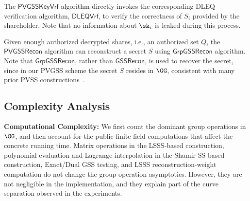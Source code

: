 \documentclass[runningheads]{llncs}
\newcommand{\gssrecon}{\mathsf{GSSRecon}}
\newcommand{\ggssrecon}{\mathsf{GrpGSSRecon}}
\newcommand{\pvgssKeyVrf}{\mathsf{PVGSSKeyVrf}}
\newcommand{\pvgssRecon}{\mathsf{PVGSSRecon}}
\newcommand{\dleqVrf}{\mathsf{DLEQVrf}}
\begin{document}
The \(\pvgssKeyVrf\) algorithm directly invokes the corresponding DLEQ verification algorithm, \(\dleqVrf\), to verify the correctness of \(S_i\) provided by the shareholder. Note that no information about $\sk_i$ is leaked during this process.


Given enough authorized decrypted shares, i.e., an authorized set $Q$, the $\pvgssRecon$ algorithm can reconstruct a secret $S$ using $\ggssrecon$ algorithm. Note that \(\ggssrecon\), rather than \(\gssrecon\), is used to recover the secret, since in our PVGSS scheme the secret \(S\) resides in \(\GG\), consistent with many prior PVSS constructions~\cite{Cascudo2017PVSS,cascudo2020albatross}.




\subsection{Complexity Analysis}
\label{sec:pvgss_complexity}


\textbf{Computational Complexity:}
We first count the dominant group operations in \(\GG\), and then account for the public finite-field computations that affect the concrete running time. Matrix operations in the LSSS-based construction, polynomial evaluation and Lagrange interpolation in the Shamir SS-based construction, Exact/Dual GSS testing, and LSSS reconstruction-weight computation do not change the group-operation asymptotics. However, they are not negligible in the implementation, and they explain part of the curve separation observed in the experiments.
\end{document}
